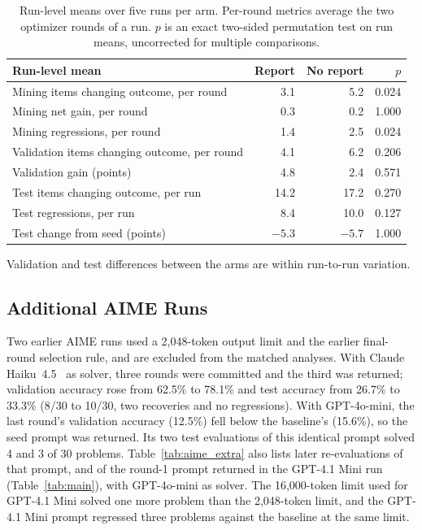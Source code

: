 \documentclass[11pt]{article}
\begin{document}
\begin{table}[htbp]
\centering
\small
\setlength{\tabcolsep}{4pt}
\begin{tabular}{lrrr}
\toprule
\rowcolor{midblue}Run-level mean & Report & No report & $p$ \\
\midrule
Mining items changing outcome, per round & 3.1 & 5.2 & 0.024 \\
Mining net gain, per round & 0.3 & 0.2 & 1.000 \\
Mining regressions, per round & 1.4 & 2.5 & 0.024 \\
Validation items changing outcome, per round & 4.1 & 6.2 & 0.206 \\
Validation gain (points) & 4.8 & 2.4 & 0.571 \\
Test items changing outcome, per run & 14.2 & 17.2 & 0.270 \\
Test regressions, per run & 8.4 & 10.0 & 0.127 \\
Test change from seed (points) & $-5.3$ & $-5.7$ & 1.000 \\
\bottomrule
\end{tabular}
\caption{Run-level means over five runs per arm. Per-round metrics average the two optimizer rounds of a run. $p$ is an
exact two-sided permutation test on run means, uncorrected for multiple comparisons.}
\label{tab:ablation_runs}
\end{table}

Validation and test differences between the arms are within run-to-run variation.

\FloatBarrier
\subsection{Additional AIME Runs}
\label{app:aime_extra}
Two earlier AIME runs used a 2,048-token output limit and the earlier final-round selection rule, and are excluded
from the matched analyses. With Claude Haiku~4.5~\citep{anthropic2025haiku45} as solver, three rounds were committed and
the third was returned; validation accuracy rose from 62.5\% to 78.1\% and test accuracy from 26.7\% to 33.3\% (8/30 to
10/30, two recoveries and no regressions). With GPT-4o-mini, the last round's validation accuracy (12.5\%) fell below the
baseline's (15.6\%), so the seed prompt was returned. Its two test evaluations of this identical prompt solved 4 and 3 of
30 problems. Table~\ref{tab:aime_extra} also lists later re-evaluations of that prompt, and of the round-1 prompt returned
in the GPT-4.1 Mini run (Table~\ref{tab:main}), with GPT-4o-mini as solver. The 16,000-token limit used for GPT-4.1 Mini
solved one more problem than the 2,048-token limit, and the GPT-4.1 Mini prompt regressed three problems against the
baseline at the same limit.
\end{document}
